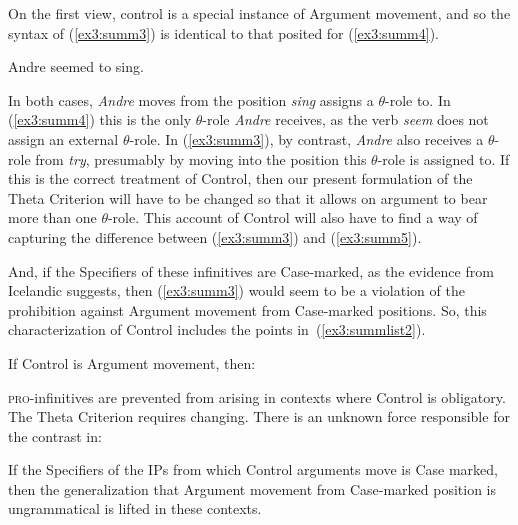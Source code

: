 On the first view, control is a special instance of Argument movement, and so the syntax of (\ref{ex3:summ3}) is identical to that posited for (\ref{ex3:summ4}).
\begin{exe}
\ex \label{ex3:summ4} Andre seemed to sing.
\end{exe}
In both cases, \emph{Andre} moves from the position \emph{sing} assigns a \mbox{$\theta$-role} to. In (\ref{ex3:summ4}) this is the only \mbox{$\theta$-role} \emph{Andre} receives, as the verb \emph{seem} does not assign an external \mbox{$\theta$-role}. In (\ref{ex3:summ3}), by contrast, \emph{Andre} also receives a \mbox{$\theta$-role} from \emph{try}, presumably by moving into the position this \mbox{$\theta$-role} is assigned to. If this is the correct treatment of Control, then our present formulation of the Theta Criterion will have to be changed so that it allows on argument to bear more than one \mbox{$\theta$-role}. This account of Control will also have to find a way of capturing the difference between (\ref{ex3:summ3}) and (\ref{ex3:summ5}).
\begin{exe}
\end{exe}
And, if the Specifiers of these infinitives are Case-marked, as the evidence from Icelandic suggests, then (\ref{ex3:summ3}) would seem to be a violation of the prohibition against Argument movement from Case-marked positions. So, this characterization of Control includes the points in~(\ref{ex3:summlist2}).
\begin{exe}
\ex \label{ex3:summlist2} If Control is Argument movement, then:
\begin{xlist}
	\ex \textsc{pro}-infinitives are prevented from arising in contexts where Control is obligatory.
	\ex The Theta Criterion requires changing.
	\ex There is an unknown force responsible for the contrast in:
	\begin{xlist}
\end{xlist}
	\ex If the Specifiers of the IPs from which Control arguments move is Case marked, then the generalization that Argument movement from Case-marked position is ungrammatical is lifted in these contexts.
\end{xlist}
\end{exe}

